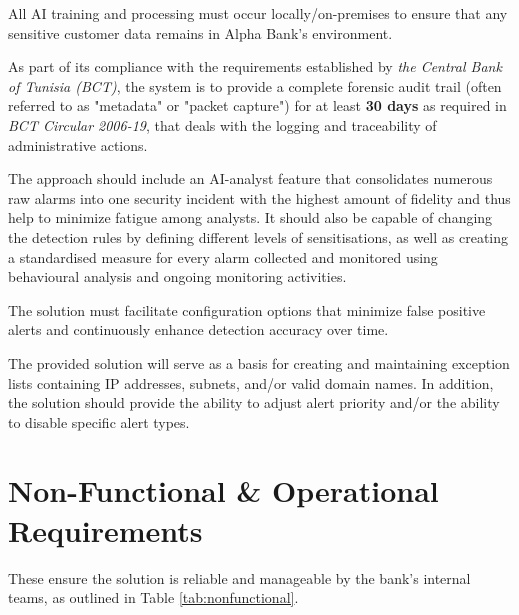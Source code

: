 \documentclass[12pt,a4paper]{report}
\begin{document}
\begin{description}[leftmargin=1.5cm, labelindent=0.5cm, style=nextline]
  \item[\textbf{Data Sovereignty}]
    All AI training and processing must occur locally/on-premises to ensure that any sensitive customer data remains in Alpha Bank’s environment.

  \item[\textbf{Auditability}]
    As part of its compliance with the requirements established by \textit{the Central Bank of Tunisia (BCT)}, the system is to provide a complete forensic audit trail (often referred to as "metadata" or "packet capture") for at least \textbf{30 days} as required in \textit{BCT Circular 2006-19}, that deals with the logging and traceability of administrative actions.

  \item[\textbf{Alert Triage Automation}]
    The approach should include an AI-analyst feature that consolidates numerous raw alarms into one security incident with the highest amount of fidelity and thus help to minimize fatigue among analysts. It should also be capable of changing the detection rules by defining different levels of sensitisations, as well as creating a standardised measure for every alarm collected and monitored using behavioural analysis and ongoing monitoring activities.

  \item[\textbf{False Positive Reduction}]
    The solution must facilitate configuration options that minimize false positive alerts and continuously enhance detection accuracy over time.

  \item[\textbf{Exceptions Management}]
    The provided solution will serve as a basis for creating and maintaining exception lists containing IP addresses, subnets, and/or valid domain names. In addition, the solution should provide the ability to adjust alert priority and/or the ability to disable specific alert types.
\end{description}

\section{Non-Functional \& Operational Requirements}

These ensure the solution is reliable and manageable by the bank's internal teams, as outlined in Table \ref{tab:nonfunctional}.
\end{document}
